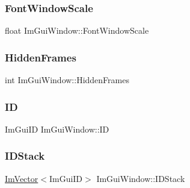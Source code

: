 \hypertarget{struct_im_gui_window_a566ce9268a466afbbec78532d5cfa3c9}{}\label{struct_im_gui_window_a566ce9268a466afbbec78532d5cfa3c9} 
\subsubsection{\texorpdfstring{Font\+Window\+Scale}{FontWindowScale}}
{\footnotesize\ttfamily float Im\+Gui\+Window\+::\+Font\+Window\+Scale}

\hypertarget{struct_im_gui_window_a91f60ca5e2e9ff4c34957e7cc239193e}{}\label{struct_im_gui_window_a91f60ca5e2e9ff4c34957e7cc239193e} 
\subsubsection{\texorpdfstring{Hidden\+Frames}{HiddenFrames}}
{\footnotesize\ttfamily int Im\+Gui\+Window\+::\+Hidden\+Frames}

\hypertarget{struct_im_gui_window_a5976b8d78bcc543ad7f23561f5cf0b8f}{}\label{struct_im_gui_window_a5976b8d78bcc543ad7f23561f5cf0b8f} 
\subsubsection{\texorpdfstring{ID}{ID}}
{\footnotesize\ttfamily Im\+Gui\+ID Im\+Gui\+Window\+::\+ID}

\hypertarget{struct_im_gui_window_a1a71724c43e37830ed9b38bd34f26917}{}\label{struct_im_gui_window_a1a71724c43e37830ed9b38bd34f26917} 
\subsubsection{\texorpdfstring{I\+D\+Stack}{IDStack}}
{\footnotesize\ttfamily \hyperlink{class_im_vector}{Im\+Vector}$<$Im\+Gui\+ID$>$ Im\+Gui\+Window\+::\+I\+D\+Stack}

\hypertarget{struct_im_gui_window_a0fd27908ebffb5d9509dc9e7f199d67d}{}\label{struct_im_gui_window_a0fd27908ebffb5d9509dc9e7f199d67d} 
